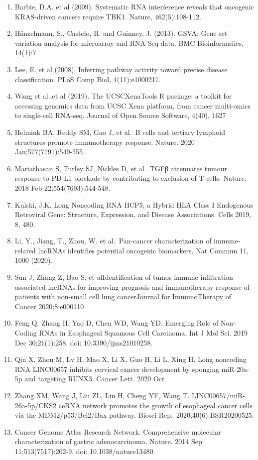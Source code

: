 \documentclass[
  12pt,
]{book}
\begin{document}
\begin{enumerate}
\item
  Barbie, D.A. et al (2009). Systematic RNA interference reveals that oncogenic KRAS-driven cancers require TBK1. Nature, 462(5):108-112.
\item
  Hänzelmann, S., Castelo, R. and Guinney, J. (2013). GSVA: Gene set variation analysis for microarray and RNA-Seq data. BMC Bioinformatics, 14(1):7.
\item
  Lee, E. et al (2008). Inferring pathway activity toward precise disease classification. PLoS Comp Biol, 4(11):e1000217.
\item
  Wang et al.,et al (2019). The UCSCXenaTools R package: a toolkit for accessing genomics data from UCSC Xena platform, from cancer multi-omics to single-cell RNA-seq. Journal of Open Source Software, 4(40), 1627
\item
  Helmink BA, Reddy SM, Gao J, et al.~B cells and tertiary lymphoid structures promote immunotherapy response. Nature. 2020 Jan;577(7791):549-555.
\item
  Mariathasan S, Turley SJ, Nickles D, et al.~TGFβ attenuates tumour response to PD-L1 blockade by contributing to exclusion of T cells. Nature. 2018 Feb 22;554(7693):544-548.
\item
  Kulski, J.K. Long Noncoding RNA HCP5, a Hybrid HLA Class I Endogenous Retroviral Gene: Structure, Expression, and Disease Associations. Cells 2019, 8, 480.
\item
  Li, Y., Jiang, T., Zhou, W. et al.~Pan-cancer characterization of immune-related lncRNAs identifies potential oncogenic biomarkers. Nat Commun 11, 1000 (2020).
\item
  Sun J, Zhang Z, Bao S, et alIdentification of tumor immune infiltration-associated lncRNAs for improving prognosis and immunotherapy response of patients with non-small cell lung cancerJournal for ImmunoTherapy of Cancer 2020;8:e000110.
\item
  Feng Q, Zhang H, Yao D, Chen WD, Wang YD. Emerging Role of Non-Coding RNAs in Esophageal Squamous Cell Carcinoma. Int J Mol Sci. 2019 Dec 30;21(1):258. doi: 10.3390/ijms21010258.
\item
  Qin X, Zhou M, Lv H, Mao X, Li X, Guo H, Li L, Xing H. Long noncoding RNA LINC00657 inhibits cervical cancer development by sponging miR-20a-5p and targeting RUNX3. Cancer Lett. 2020 Oct
\item
  Zhang XM, Wang J, Liu ZL, Liu H, Cheng YF, Wang T. LINC00657/miR-26a-5p/CKS2 ceRNA network promotes the growth of esophageal cancer cells via the MDM2/p53/Bcl2/Bax pathway. Biosci Rep.~2020;40(6):BSR20200525.
\item
  Cancer Genome Atlas Research Network. Comprehensive molecular characterization of gastric adenocarcinoma. Nature. 2014 Sep 11;513(7517):202-9. doi: 10.1038/nature13480.
\end{enumerate}

  
\end{document}
